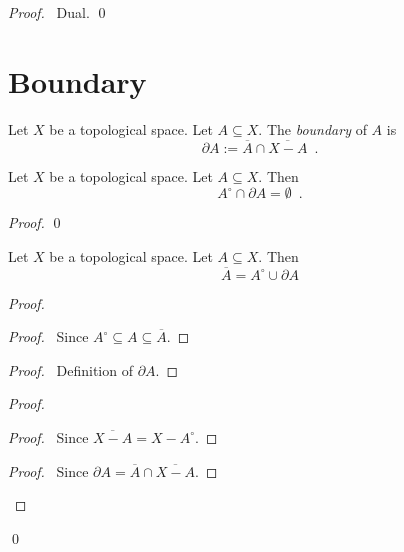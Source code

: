 \begin{proof}
\pf\ Dual. \qed
\end{proof}

\section{Boundary}

\begin{df}[Boundary]
Let $X$ be a topological space. Let $A \subseteq X$. The \emph{boundary} of $A$ is
\[ \partial A := \overline{A} \cap \overline{X - A} \enspace . \]
\end{df}

\begin{prop}
Let $X$ be a topological space. Let $A \subseteq X$. Then
\[ A^\circ \cap \partial A = \emptyset \enspace . \]
\end{prop}

\begin{proof}
\pf
{}
\qed
\end{proof}

\begin{prop}
\label{prop:closure_boundary}
Let $X$ be a topological space. Let $A \subseteq X$. Then
\[ \overline{A} = A^\circ \cup \partial A \]
\end{prop}

\begin{proof}
\begin{proof}
	\pf\ Since $A^\circ \subseteq A \subseteq \overline{A}$.
\end{proof}
\begin{proof}
	\pf\ Definition of $\partial A$.
\end{proof}
\begin{proof}
	\begin{proof}
		\pf\ Since $\overline{X-A} = X - A^\circ$.
	\end{proof}
	\begin{proof}
		\pf\ Since $\partial A = \overline{A} \cap \overline{X-A}$.
	\end{proof}
\end{proof}
\qed
\end{proof}

